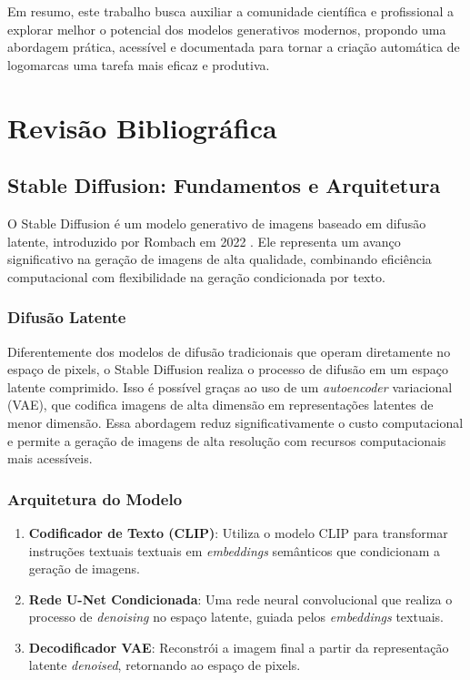 \documentclass[12pt, %
openright, 
oneside, %
a4paper,    %
brazil]{facom-ufu-abntex2}
\begin{document}
Em resumo, este trabalho busca auxiliar a comunidade científica e profissional a explorar melhor o potencial dos modelos generativos modernos, propondo uma abordagem prática, acessível e documentada para tornar a criação automática de logomarcas uma tarefa mais eficaz e produtiva.



\chapter{Revisão Bibliográfica}

\section{Stable Diffusion: Fundamentos e Arquitetura}

O Stable Diffusion é um modelo generativo de imagens baseado em difusão latente, introduzido por Rombach em 2022 \cite{rombach2022highresolutionimagesynthesislatent}. Ele representa um avanço significativo na geração de imagens de alta qualidade, combinando eficiência computacional com flexibilidade na geração condicionada por texto.

\subsection{Difusão Latente}

Diferentemente dos modelos de difusão tradicionais que operam diretamente no espaço de pixels, o Stable Diffusion realiza o processo de difusão em um espaço latente comprimido. Isso é possível graças ao uso de um \textit{autoencoder} variacional (VAE), que codifica imagens de alta dimensão em representações latentes de menor dimensão. Essa abordagem reduz significativamente o custo computacional e permite a geração de imagens de alta resolução com recursos computacionais mais acessíveis.

\subsection{Arquitetura do Modelo}

\begin{enumerate}
    \item \textbf{Codificador de Texto (CLIP)}: Utiliza o modelo CLIP para transformar instruções textuais textuais em \textit{embeddings} semânticos que condicionam a geração de imagens.
    \item \textbf{Rede U-Net Condicionada}: Uma rede neural convolucional que realiza o processo de \textit{denoising} no espaço latente, guiada pelos \textit{embeddings} textuais.
    \item \textbf{Decodificador VAE}: Reconstrói a imagem final a partir da representação latente \textit{denoised}, retornando ao espaço de pixels.
\end{enumerate}
\end{document}
